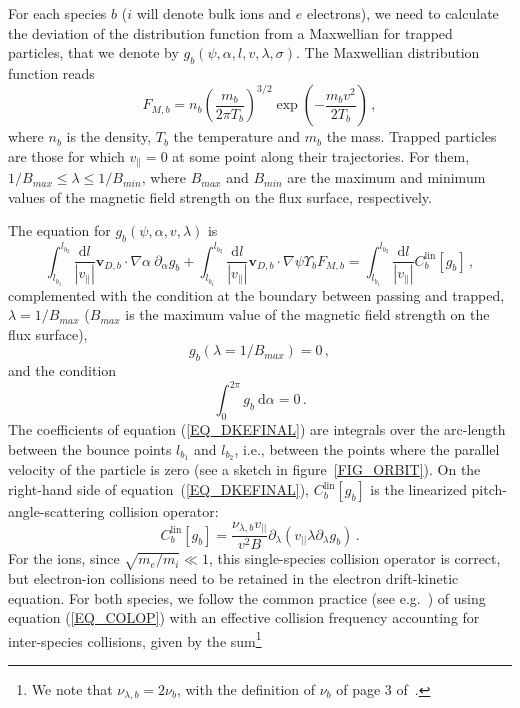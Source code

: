 For each species $b$ ($i$ will denote bulk ions and $e$ electrons), we need to calculate the deviation of the distribution function from a Maxwellian for trapped particles, that we denote by $g_b(\psi,\alpha,l,v,\lambda,\sigma)$. The Maxwellian distribution function reads
\begin{equation}
 F_{M,b}=n_b\left(\frac{m_b}{2\pi T_b}\right)^{3/2}\exp{\left(-\frac{m_bv^2}{2T_b}\right)}\,,
\end{equation}
where $n_b$ is the density, $T_b$ the temperature and $m_b$ the mass. Trapped particles are those for which $v_\parallel=0$ at some point along their trajectories. For them, $1/B_{max}\le\lambda\le1/B_{min}$, where $B_{max}$ and $B_{min}$ are the maximum and minimum values of the magnetic field strength on the flux surface, respectively.

The equation for $g_b(\psi,\alpha,v,\lambda)$ is
\begin{equation}
\int_{l_{b_1}}^{l_{b_2}} \frac{\mathrm{d}l}{|v_\parallel|} \mathbf{v}_{D,b}\cdot\nabla\alpha~\partial_\alpha g_b+\int_{l_{b_1}}^{l_{b_2}} \frac{\mathrm{d}l}{|v_\parallel|} \mathbf{v}_{D,b}\cdot\nabla \psi \Upsilon_b F_{M,b} =\int_{l_{b_1}}^{l_{b_2}} \frac{\mathrm{d}l}{|v_\parallel|} C_b^{\mathrm{lin}}[g_b]\,,
\label{EQ_DKEFINAL}
\end{equation}
complemented with the condition at the boundary between passing and trapped, $\lambda = 1/B_{max}$ ($B_{max}$ is the maximum value of the magnetic field strength on the flux surface),\begin{equation}
g_b (\lambda=1/B_{max})=0\,,
\label{EQ_CONT2}
\end{equation}
and the condition
\begin{equation}
\int_0^{2\pi}g_b~\mathrm{d}\alpha =0\,.
\label{EQ_CONT1}
\end{equation}
The coefficients of equation (\ref{EQ_DKEFINAL}) are integrals over the arc-length between the bounce points $l_{b_1}$ and $l_{b_2}$, i.e., between the points where the parallel velocity of the particle is zero (see a sketch in figure~\ref{FIG_ORBIT}). On the right-hand side of equation~(\ref{EQ_DKEFINAL}), $C_b^{\mathrm{lin}}[g_b]$ is the linearized pitch-angle-scattering collision operator:
\begin{equation}
C_b^{\mathrm{lin}}[g_b]=
\frac{\nu_{\lambda,b} v_{||}}{v^2 B}\partial_\lambda\left(v_{||}\lambda\partial_\lambda g_b \right)\,.
\label{EQ_COLOP}
\end{equation}
For the ions, since $\sqrt{m_e/m_i}\ll 1$, this single-species collision operator is correct, but electron-ion collisions need to be retained in the electron drift-kinetic equation. For both species, we follow the common practice (see e.g.~\citep{beidler2011icnts}) of using equation (\ref{EQ_COLOP}) with an effective collision frequency accounting for inter-species collisions, given by the sum\footnote{We note that $\nu_{\lambda,b}=2\nu_b$, with the definition of $\nu_b$ of page 3 of~\cite{beidler2011icnts}.}

